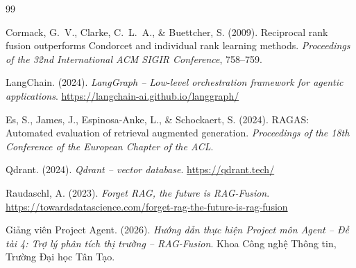 \documentclass[12pt, a4paper]{report}
\begin{document}
\begin{thebibliography}{99}

Cormack, G.~V., Clarke, C.~L.~A., \& Buettcher, S. (2009).
Reciprocal rank fusion outperforms Condorcet and individual rank learning methods.
\textit{Proceedings of the 32nd International ACM SIGIR Conference}, 758--759.

LangChain. (2024).
\textit{LangGraph -- Low-level orchestration framework for agentic applications}.
\url{https://langchain-ai.github.io/langgraph/}

Es, S., James, J., Espinosa-Anke, L., \& Schockaert, S. (2024).
RAGAS: Automated evaluation of retrieval augmented generation.
\textit{Proceedings of the 18th Conference of the European Chapter of the ACL}.

Qdrant. (2024).
\textit{Qdrant -- vector database}.
\url{https://qdrant.tech/}

Raudaschl, A. (2023).
\textit{Forget RAG, the future is RAG-Fusion}.
\url{https://towardsdatascience.com/forget-rag-the-future-is-rag-fusion}

Giảng viên Project Agent. (2026).
\textit{Hướng dẫn thực hiện Project môn Agent -- Đề tài 4: Trợ lý phân tích thị trường -- RAG-Fusion}.
Khoa Công nghệ Thông tin, Trường Đại học Tân Tạo.

\end{thebibliography}
\end{document}
